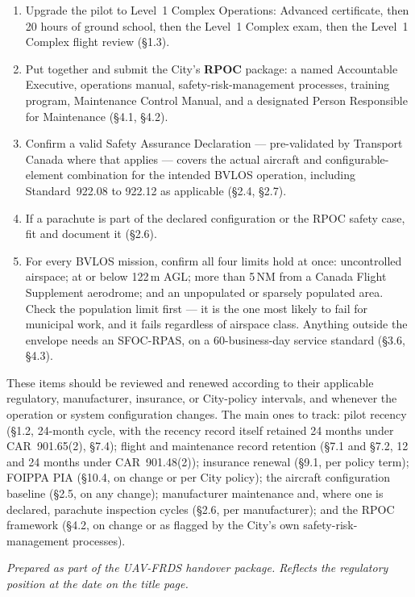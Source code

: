 \documentclass[11pt,letterpaper]{article}
\begin{document}
\begin{infobox}
\begin{enumerate}[leftmargin=1.6em, itemsep=2pt]
  \item Upgrade the pilot to Level~1 Complex Operations: Advanced
        certificate, then 20 hours of ground school, then the
        Level~1 Complex exam, then the Level~1 Complex flight
        review (\S1.3).
  \item Put together and submit the City's \textbf{RPOC} package:
        a named Accountable Executive, operations manual,
        safety-risk-management processes, training program,
        Maintenance Control Manual, and a designated Person
        Responsible for Maintenance (\S4.1, \S4.2).
  \item Confirm a valid Safety Assurance Declaration --- pre-validated
        by Transport Canada where that applies --- covers the actual
        aircraft and configurable-element combination for the intended
        BVLOS operation, including Standard~922.08 to 922.12 as
        applicable (\S2.4, \S2.7).
  \item If a parachute is part of the declared configuration or the
        RPOC safety case, fit and document it (\S2.6).
  \item For every BVLOS mission, confirm all four limits hold at
        once: uncontrolled airspace; at or below 122\,m AGL; more
        than 5\,NM from a Canada Flight Supplement aerodrome; and an
        unpopulated or sparsely populated area. Check the population
        limit first --- it is the one most likely to fail for
        municipal work, and it fails regardless of airspace class.
        Anything outside the envelope needs an SFOC-RPAS, on a
        60-business-day service standard (\S3.6, \S4.3).
\end{enumerate}
\end{infobox}

\vspace{0.8em}
These items should be reviewed and renewed according to their
applicable regulatory, manufacturer, insurance, or City-policy
intervals, and whenever the operation or system configuration changes.
The main ones to track: pilot recency (\S1.2, 24-month cycle, with the
recency record itself retained 24 months under CAR~901.65(2), \S7.4);
flight and maintenance record retention (\S7.1 and \S7.2, 12 and 24
months under CAR~901.48(2)); insurance renewal (\S9.1, per policy
term); FOIPPA PIA (\S10.4, on change or per City policy); the aircraft
configuration baseline (\S2.5, on any change); manufacturer maintenance
and, where one is declared, parachute inspection cycles (\S2.6, per
manufacturer); and the RPOC framework (\S4.2, on change or as flagged
by the City's own safety-risk-management processes).

\vspace{0.6em}

\begin{center}
{\color{uavgrey}\small\itshape
Prepared as part of the UAV-FRDS handover package. Reflects the
regulatory position at the date on the title page.}
\end{center}
\end{document}
